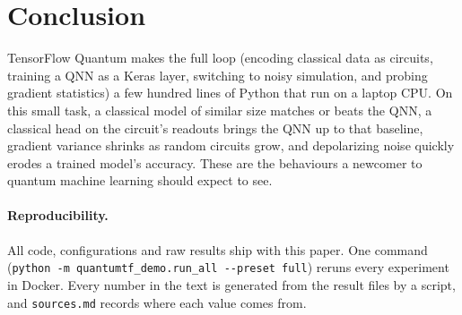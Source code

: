 \section{Conclusion}
\label{sec:conclusion}

TensorFlow Quantum makes the full loop (encoding classical data as circuits, training a QNN as a Keras
layer, switching to noisy simulation, and probing gradient statistics) a few hundred lines of Python
that run on a laptop CPU. On this small task, a classical model of similar size matches or beats the QNN, a
classical head on the circuit's readouts brings the QNN up to that baseline, gradient variance shrinks as
random circuits grow, and depolarizing noise quickly erodes a trained model's accuracy. These are the behaviours a newcomer to quantum machine
learning should expect to see.

\paragraph{Reproducibility.}
All code, configurations and raw results ship with this paper. One command
(\texttt{python -m quantumtf\_demo.run\_all -{}-preset full}) reruns every experiment in Docker. Every
number in the text is generated from the result files by a script, and \texttt{sources.md} records where
each value comes from.
